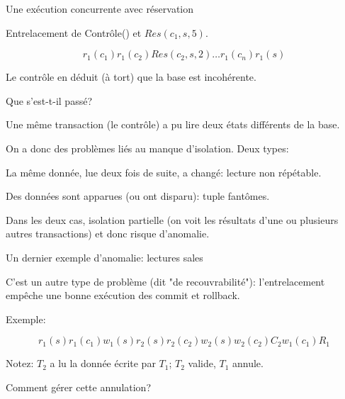\begin{frame}[fragile]{Une exécution concurrente avec réservation}

Entrelacement de Contrôle()  et 
$Res(c_1, s, 5)$.


$$r_1(c_1) r_1(c_2)  Res(c_2, s, 2)  \ldots r_1(c_n) r_1(s)$$

\smallskip


\vfill
\begin{blocgauche}
\alert{Le contrôle en déduit (à tort) que la base est incohérente.}
\end{blocgauche}
\end{frame}


\begin{frame}[fragile]{Que s'est-t-il passé?}

Une même transaction (le contrôle) a pu lire deux états \alert{différents} de la base.

\vfill

On a donc des problèmes liés au manque d'isolation. Deux types:

\begin{redbullet}
  \item La même donnée, lue deux fois de suite, a changé: \alert{lecture non répétable}.
  \item Des données sont apparues (ou ont disparu): \alert{tuple fantômes}.
\end{redbullet}

\vfill

\begin{blocgauche}
Dans les deux cas, isolation partielle (on voit les résultats d'une ou plusieurs
autres transactions) et donc risque d'anomalie.
\end{blocgauche}

\end{frame}

\begin{frame}{Un dernier exemple d'anomalie: lectures sales}

C'est un autre type de problème (dit "de recouvrabilité"): \alert{l'entrelacement empêche
une bonne exécution des \alert{commit} et \alert{rollback}}.

\vfill
Exemple:

$$r_1(s)  r_1(c_1) w_1(s) r_2(s) r_2(c_2) w_2(s)  w_2(c_2) C_2 w_1(c_1)  R_1$$

\vfill

Notez: $T_2$ a lu la donnée écrite par $T_1$; $T_2$ valide, $T_1$ annule.

\vfill
\alert{Comment gérer cette annulation?}

\end{frame}


